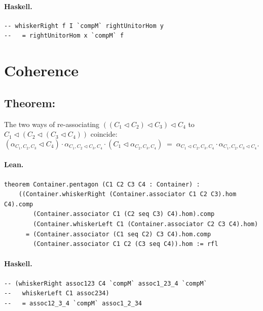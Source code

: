 \documentclass[11pt,a4paper]{article}
\begin{document}
\paragraph{Haskell.}
\begin{lstlisting}[style=haskell]
-- whiskerRight f I `compM` rightUnitorHom y
--   = rightUnitorHom x `compM` f
\end{lstlisting}


\section{Coherence}

\subsection{Theorem: }

\begin{thm}
The two ways of re-associating
$((C_1 \triangleleft C_2) \triangleleft C_3) \triangleleft C_4$
to $C_1 \triangleleft (C_2 \triangleleft (C_3 \triangleleft C_4))$ coincide:
\[
  (\alpha_{C_1,C_2,C_3} \triangleleft C_4) \cdot
  \alpha_{C_1, C_2 \triangleleft C_3, C_4} \cdot
  (C_1 \triangleleft \alpha_{C_2,C_3,C_4})
  \;=\;
  \alpha_{C_1 \triangleleft C_2, C_3, C_4} \cdot
  \alpha_{C_1, C_2, C_3 \triangleleft C_4}.
\]
\end{thm}

\paragraph{Lean.}
\begin{lstlisting}[style=lean]
theorem Container.pentagon (C1 C2 C3 C4 : Container) :
    ((Container.whiskerRight (Container.associator C1 C2 C3).hom C4).comp
        (Container.associator C1 (C2 seq C3) C4).hom).comp
        (Container.whiskerLeft C1 (Container.associator C2 C3 C4).hom)
      = (Container.associator (C1 seq C2) C3 C4).hom.comp
        (Container.associator C1 C2 (C3 seq C4)).hom := rfl
\end{lstlisting}

\paragraph{Haskell.}
\begin{lstlisting}[style=haskell]
-- (whiskerRight assoc123 C4 `compM` assoc1_23_4 `compM`
--   whiskerLeft C1 assoc234)
--   = assoc12_3_4 `compM` assoc1_2_34
\end{lstlisting}
\end{document}
